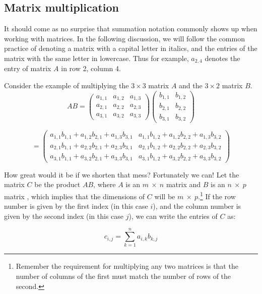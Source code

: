 \subsection{Matrix multiplication}
It should come as no surprise that summation notation commonly shows up when working with matrices. In the following discussion, we will follow the common practice of denoting a matrix with a capital letter in italics, and the entries of the matrix with the same letter in lowercase. Thus for example, $a_{2,4}$ denotes the entry of matrix $A$ in row 2, column 4.
   
 Consider the example of multiplying the $3 \times 3$ matrix $A$ and the $3 \times 2$ matrix $B$. 
\[{A}{B} = \left( \begin{array}{ccc}
a_{1,1} & a_{1,2}  & a_{1,3}  \\
a_{2,1} & a_{2,2} & a_{2,3} \\
a_{3,1} & a_{3,2} & a_{3,3} \end{array} \right)
 \left( \begin{array}{cc}
b_{1,1} & b_{1,2}    \\
b_{2,1} & b_{2,2}  \\
b_{3,1} & b_{3,2}  \end{array} \right) \]

\[= \left( \begin{array}{cc}
a_{1,1} b_{1,1} + a_{1,2} b_{2,1} + a_{1,3} b_{3,1} & a_{1,1} b_{1,2} + a_{1,2} b_{2,2} + a_{1,3} b_{3,2}  \\
a_{2,1} b_{1,1} + a_{2,2} b_{2,1} + a_{2,3} b_{3,1} & a_{2,1} b_{1,2} + a_{2,2} b_{2,2} + a_{2,3} b_{3,2}  \\
a_{3,1} b_{1,1} + a_{3,2} b_{2,1} + a_{3,3} b_{3,1} & a_{3,1} b_{1,2} + a_{3,2} b_{2,2} + a_{3,3} b_{3,2}  \end{array} \right) \]

How great would it be if we shorten that mess?  Fortunately we can!  Let the matrix ${C}$ be the product ${A} {B}$, where ${A}$ is an $m ~\times ~n$ matrix  and ${B}$ is an $n ~\times ~p$ matrix , which implies that the dimensions of ${C}$ will be $m ~ \times ~ p$.\footnote{Remember the requirement for multiplying any two matrices is that the number of columns of the first must match the number of rows of the second.}  If the row number is given by the first index (in this case $i$), and the column number is given by the second index (in this case $j$), we can write the entries of  ${C}$ as: 

\[ {c}_{i,j}= \sum_{k=1}^n a_{i,k} b_{k,j} \]

